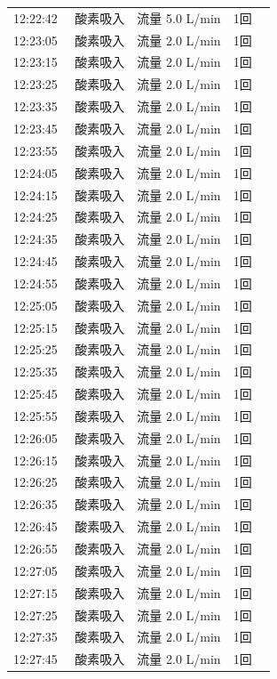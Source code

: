 \documentclass[UTF8,10pt,a4paper,fontset=fandol]{ctexart}
\begin{document}
\begin{minipage}[t]{0.48\linewidth}
\scriptsize
\begin{tabular}{@{}p{0.22\linewidth}p{0.72\linewidth}@{}}
12:22:42 & 酸素吸入　流量 5.0 L/min　1回\\
12:23:05 & 酸素吸入　流量 2.0 L/min　1回\\
12:23:15 & 酸素吸入　流量 2.0 L/min　1回\\
12:23:25 & 酸素吸入　流量 2.0 L/min　1回\\
12:23:35 & 酸素吸入　流量 2.0 L/min　1回\\
12:23:45 & 酸素吸入　流量 2.0 L/min　1回\\
12:23:55 & 酸素吸入　流量 2.0 L/min　1回\\
12:24:05 & 酸素吸入　流量 2.0 L/min　1回\\
12:24:15 & 酸素吸入　流量 2.0 L/min　1回\\
12:24:25 & 酸素吸入　流量 2.0 L/min　1回\\
12:24:35 & 酸素吸入　流量 2.0 L/min　1回\\
12:24:45 & 酸素吸入　流量 2.0 L/min　1回\\
12:24:55 & 酸素吸入　流量 2.0 L/min　1回\\
12:25:05 & 酸素吸入　流量 2.0 L/min　1回\\
12:25:15 & 酸素吸入　流量 2.0 L/min　1回\\
12:25:25 & 酸素吸入　流量 2.0 L/min　1回\\
12:25:35 & 酸素吸入　流量 2.0 L/min　1回\\
12:25:45 & 酸素吸入　流量 2.0 L/min　1回\\
12:25:55 & 酸素吸入　流量 2.0 L/min　1回\\
12:26:05 & 酸素吸入　流量 2.0 L/min　1回\\
12:26:15 & 酸素吸入　流量 2.0 L/min　1回\\
12:26:25 & 酸素吸入　流量 2.0 L/min　1回\\
12:26:35 & 酸素吸入　流量 2.0 L/min　1回\\
12:26:45 & 酸素吸入　流量 2.0 L/min　1回\\
12:26:55 & 酸素吸入　流量 2.0 L/min　1回\\
12:27:05 & 酸素吸入　流量 2.0 L/min　1回\\
12:27:15 & 酸素吸入　流量 2.0 L/min　1回\\
12:27:25 & 酸素吸入　流量 2.0 L/min　1回\\
12:27:35 & 酸素吸入　流量 2.0 L/min　1回\\
12:27:45 & 酸素吸入　流量 2.0 L/min　1回\\

\end{tabular}
\end{minipage}
\end{document}
